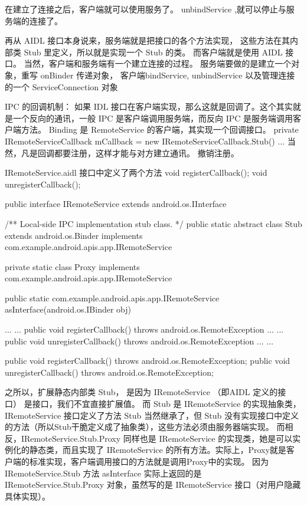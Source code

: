 \documentclass{book}
\begin{document}
\begin{CJK}{UTF8}{gbsn}
在建立了连接之后，客户端就可以使用服务了。  unbindService
,就可以停止与服务端的连接了。

再从 AIDL 接口本身说来，服务端就是把接口的各个方法实现， 这些方法在其内部类
Stub 里定义，所以就是实现一个 Stub 的类。
而客户端就是使用 AIDL 接口。
当然，客户端和服务端有一个建立连接的过程。 服务端要做的是建立一个对象，重写 onBinder
传递对象， 客户端bindService, unbindService 以及管理连接的一个 ServiceConnection 对象


IPC 的回调机制：
如果 IDL 接口在客户端实现，那么这就是回调了。这个其实就是一个反向的通讯，一般
IPC 是客户端调用服务端，而反向 IPC 是服务端调用客户端方法。
Binding 是 RemoteService 的客户端，其实现一个回调接口。
 private IRemoteServiceCallback mCallback = new IRemoteServiceCallback.Stub() {
     ...
 }
当然，凡是回调都要注册，这样才能与对方建立通讯。 撤销注册。

IRemoteService.aidl 接口中定义了两个方法
 void registerCallback();
 void unregisterCallback();

public interface IRemoteService extends android.os.IInterface{
    /** Local-side IPC implementation stub class. */
        public static abstract class Stub extends android.os.Binder implements com.example.android.apis.app.IRemoteService {
            private static class Proxy implements com.example.android.apis.app.IRemoteService {
               public static com.example.android.apis.app.IRemoteService asInterface(android.os.IBinder obj)
              {

               
               ... ... 
                 public void registerCallback() throws android.os.RemoteException {
                 ... ...}
                 public void unregisterCallback() throws android.os.RemoteException {
                     ... ... }
            }
        }

   public void registerCallback() throws android.os.RemoteException;  
   public void unregisterCallback() throws android.os.RemoteException;  
}
之所以，扩展静态内部类 Stub， 是因为 IRemoteService （即AIDL 定义的接口）
是接口，我们不宜直接扩展值。 而 Stub 是 IRemoteService 的实现抽象类，
IRemoteService 接口定义了方法 Stub 当然继承了，但 Stub
没有实现接口中定义的方法（所以Stub干脆定义成了抽象类），这些方法必须由服务器端实现。  
而相反，IRemoteService.Stub.Proxy 同样也是 IRemoteService
的实现类，她是可以实例化的静态类，而且实现了 IRemoteService
的所有方法。实际上，Proxy就是客户端的标准实现，客户端调用接口的方法就是调用Proxy中的实现。
因为 IRemoteService.Stub 方法 asInterface 实际上返回的是
IRemoteService.Stub.Proxy 对象，虽然写的是 IRemoteService
接口（对用户隐藏具体实现）。

}
\end{CJK}
\end{document}

